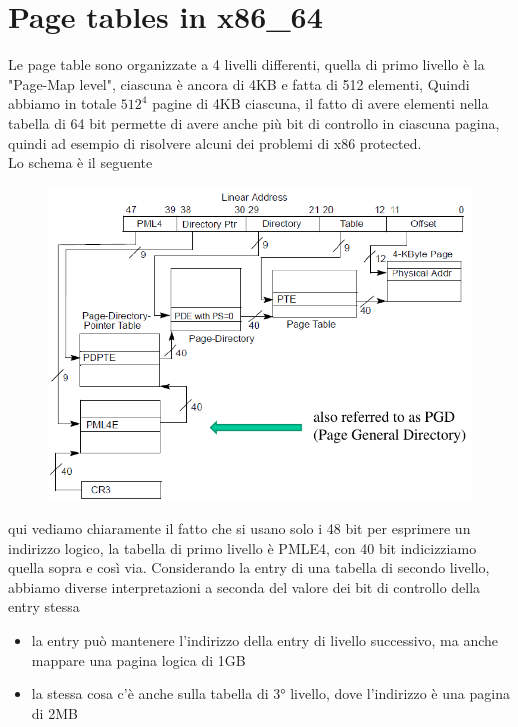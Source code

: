 \documentclass[12pt, oneside]{extbook}
\begin{document}
\section{Page tables in x86\_64}
Le page table sono organizzate a 4 livelli differenti, quella di primo livello è la "Page-Map level", ciascuna è ancora di 4KB e fatta di 512 elementi, Quindi abbiamo in totale $512^4$ pagine di 4KB ciascuna, il fatto di avere elementi nella tabella di 64 bit permette di avere anche più bit di controllo in ciascuna pagina, quindi ad esempio di risolvere alcuni dei problemi di x86 protected.\\ Lo schema è il seguente
\begin{figure}[!h]
	\includegraphics[scale=0.4]{immagini/page_table_x86_64.png}
\end{figure}
qui vediamo chiaramente il fatto che si usano solo i 48 bit per esprimere un indirizzo logico, la tabella di primo livello è PMLE4, con 40 bit indicizziamo quella sopra e così via. Considerando la entry di una tabella di secondo livello, abbiamo diverse interpretazioni a seconda del valore dei bit di controllo della entry stessa
\begin{itemize}
\item la entry può mantenere l'indirizzo della entry di livello successivo, ma anche mappare una pagina logica di 1GB
\item la stessa cosa c'è anche sulla tabella di 3° livello, dove l'indirizzo è una pagina di 2MB
\end{itemize}
\end{document}
